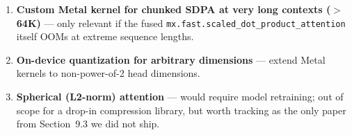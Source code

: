 \documentclass[11pt,a4paper]{article}
\begin{document}
\begin{enumerate}[label=\arabic*.]
  \item \textbf{Custom Metal kernel for chunked SDPA at very long contexts ($>$64K)} --- only relevant if the fused \texttt{mx.fast.scaled\_dot\_product\_attention} itself OOMs at extreme sequence lengths.
  \item \textbf{On-device quantization for arbitrary dimensions} --- extend Metal kernels to non-power-of-2 head dimensions.
  \item \textbf{Spherical (L2-norm) attention} --- would require model retraining; out of scope for a drop-in compression library, but worth tracking as the only paper from Section~9.3 we did not ship.
\end{enumerate}


\end{document}
